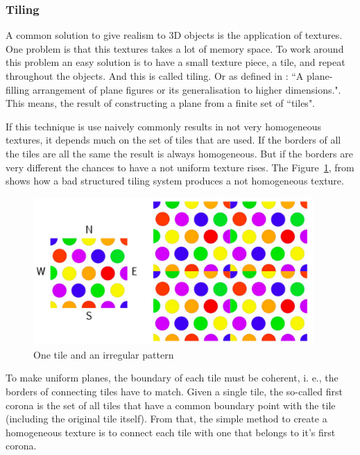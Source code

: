 
\subsubsection{Tiling} %
\label{ssub:tiling}

A common solution to give realism to 3D objects is the application of textures. One problem is that this textures takes a lot of memory space. To work around this problem an easy solution is to have a small texture piece, a tile, and repeat throughout the objects. And this is called tiling. Or as defined in \cite{TilingWOLFRAM}: ``A plane-filling arrangement of plane figures or its generalisation to higher dimensions.".  This means, the result of constructing a plane from a finite set of ``tiles". 

If this technique is use naively commonly results in not very homogeneous textures, it depends much on the set of tiles that are used. If the borders of all the tiles are all the same the result is always homogeneous. But if the borders are very different the chances to have a not uniform texture rises. The Figure~\ref{fig:TIrregulartexture}, from \cite{ProcWorld} shows how a bad structured tiling system produces a not homogeneous texture.  


\begin{figure}[htbp]
	\centering
	\includegraphics[width=0.95\textwidth]{img/Theory/Tiling/iregular.png}
	\caption{One tile and an irregular pattern}
	\label{fig:TIrregulartexture}
\end{figure}


To make uniform planes, the boundary of each tile must be coherent, i. e., the borders of connecting tiles have to match. Given a single tile, the so-called first corona is the set of all tiles that have a common boundary point with the tile (including the original tile itself). From that, the simple method to create a homogeneous texture is to connect each tile with one that belongs to it's first corona.

